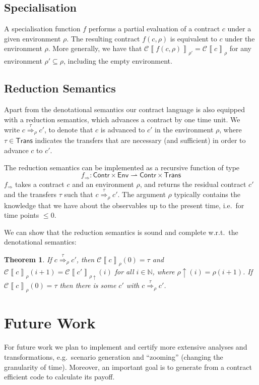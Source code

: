 \documentclass[a4paper,debug,twocolumn]{easychair}
\newcommand\type[1]{\mathsf{#1}}
\newcommand\nats{{\mathbb N}}
\newcommand\pto{\rightharpoonup}
\newcommand\cSem[2]{{\mathcal C}\left\llbracket#1\right\rrbracket_{#2}}
\newcommand\cRed[2]{\stackrel{#2}\Rightarrow_{#1}}
\newcommand\cRedFun{f_{\Rightarrow}}
\newcommand\envAdv[1]{#1\uparrow}
\theoremstyle{plain}
\newtheorem{theorem}{Theorem}
\begin{document}
\subsection{Specialisation}
\label{sec:specialisation}

A specialisation function $f$ performs a partial evaluation of a
contract $c$ under a given environment $\rho$. The resulting contract
$f(c,\rho)$ is equivalent to $c$ under the environment $\rho$. More
generally, we have that $\cSem{f(c,\rho)}{\rho'} = \cSem c \rho$ for
any environment $\rho' \subseteq \rho$, including the empty
environment.



\subsection{Reduction Semantics}
\label{sec:reduction-semantics}


Apart from the denotational semantics our contract language is also
equipped with a reduction semantics, which advances a contract by one
time unit. We write $c \cRed \rho \tau c'$, to denote that $c$ is
advanced to $c'$ in the environment $\rho$, where $\tau \in
\type{Trans}$ indicates the transfers that are necessary (and
sufficient) in order to advance $c$ to $c'$.

The reduction semantics can be implemented as a recursive function of
type 
\[
\cRedFun \colon\type{Contr}\times \type{Env} \pto \type{Contr} \times \type{Trans}
\]
$\cRedFun$ takes a contract $c$ and an environment $\rho$, and returns
the residual contract $c'$ and the transfers $\tau$ such that $c
\cRed\rho\tau c'$. The argument $\rho$ typically contains the
knowledge that we have about the observables up to the present time,
i.e.\ for time points $\leq 0$.

We can show that the reduction semantics is sound and complete w.r.t.\
the denotational semantics:
\begin{theorem}
  If $c \cRed\rho\tau c'$, then $\cSem c {\rho} (0) = \tau$ and $\cSem
  c {\rho} (i+1) = \cSem{c'}{\envAdv{\rho}}(i)$ for all $i \in \nats$,
  where $\envAdv{\rho} (i) = \rho(i+1)$. If $\cSem c \rho (0) = \tau$
  then there is some $c'$ with $c \cRed\rho\tau c'$.
\end{theorem}


\section{Future Work}
\label{sec:disc-future-work}

For future work we plan to implement and certify more extensive
analyses and transformations, e.g.\ scenario generation and
``zooming'' (changing the granularity of time). Moreover, an important
goal is to generate from a contract efficient code to calculate its
payoff.




\end{document}
